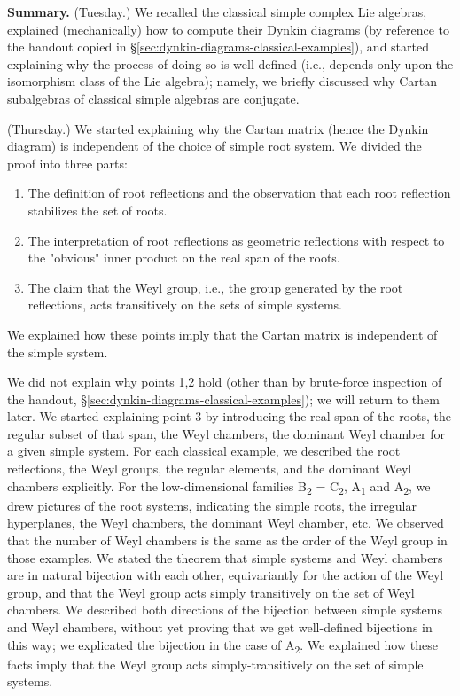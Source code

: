 \documentclass[reqno]{amsart} 
\begin{document}
\textbf{Summary.} (Tuesday.) We recalled the classical simple complex Lie algebras,
explained (mechanically) how to compute their Dynkin diagrams (by
reference to the handout copied in \S\ref{sec:dynkin-diagrams-classical-examples}), and started explaining why the process of
doing so is well-defined (i.e., depends only upon the isomorphism
class of the Lie algebra); namely, we briefly discussed why Cartan
subalgebras of classical simple algebras are conjugate.

(Thursday.) We started explaining why the Cartan matrix (hence the
Dynkin diagram) is independent of the choice of simple root system.
We divided the proof into three parts:
\begin{enumerate}
\item The definition of root reflections and the observation that each
root reflection stabilizes the set of roots.
\item The interpretation of root reflections as geometric reflections
with respect to the "obvious" inner product on the real span of the
roots.
\item The claim that the Weyl group, i.e., the group generated by the
root reflections, acts transitively on the sets of simple systems.
\end{enumerate}
We explained how these points imply that the Cartan matrix is
independent of the simple system.  

We did not explain why points 1,2 hold (other than by brute-force
inspection of the handout, \S\ref{sec:dynkin-diagrams-classical-examples}); we will return to them later.
We started explaining point 3 by introducing the real span of the roots,
the regular subset of that span, the Weyl chambers, the dominant Weyl
chamber for a given simple system.  For each classical example, we
described the root reflections, the Weyl groups, the regular elements,
and the dominant Weyl chambers explicitly.  For the low-dimensional
families B\textsubscript{2} = C\textsubscript{2}, A\textsubscript{1} and A\textsubscript{2}, we drew pictures of the root systems,
indicating the simple roots, the irregular hyperplanes, the Weyl
chambers, the dominant Weyl chamber, etc.  We observed that the number
of Weyl chambers is the same as the order of the Weyl group in those
examples.  We stated the theorem that simple systems and Weyl chambers
are in natural bijection with each other, equivariantly for the action
of the Weyl group, and that the Weyl group acts simply transitively on
the set of Weyl chambers.  We described both directions of the
bijection between simple systems and Weyl chambers, without yet
proving that we get well-defined bijections in this way; we explicated
the bijection in the case of A\textsubscript{2}.  We explained
how these facts imply that the Weyl group acts simply-transitively on
the set of simple systems.
\end{document}
